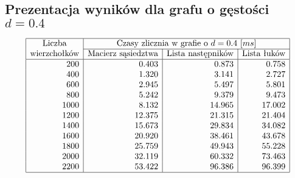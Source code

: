 \documentclass[polish,polish,a4paper]{article}
\begin{document}
\begin{spacing}{1.25}
\begin{figure}[H]
\end{figure}

\subsection{Prezentacja wyników dla grafu o gęstości $d=0.4$}

\begin{spacing}{1.5}
	\begin{equation*}
	\begin{array}{|r|r|r|r|}
		\hline
	\multicolumn{1}{|c|}{$Liczba$}&	\multicolumn{3}{c|}{$Czasy zlicznia w grafie o $d=0.4$ $[ms]}\\\cline{2-4}
	\multicolumn{1}{|c|}{$wierzchołków$}&\multicolumn{1}{c|}{$Macierz sąsiedztwa$}&\multicolumn{1}{c|}{$Lista następników$}&\multicolumn{1}{c|}{$Lista łuków$}\\\hline
	200&0.403&0.873&0.758\\
	400&1.320&3.141&2.727\\
	600&2.945&5.497&5.801\\
	800&5.242&9.379&9.473\\
	1000&8.132&14.965&17.002\\
	1200&12.375&21.315&21.404\\
	1400&15.673&29.834&34.082\\
	1600&20.920&38.461&43.678\\
	1800&25.759&49.943&55.228\\
	2000&32.119&60.332&73.463\\
	2200&53.422&96.386&96.399\\
	\hline
	\end{array}
	\end{equation*}
\end{spacing}


\end{spacing}
\end{document}
